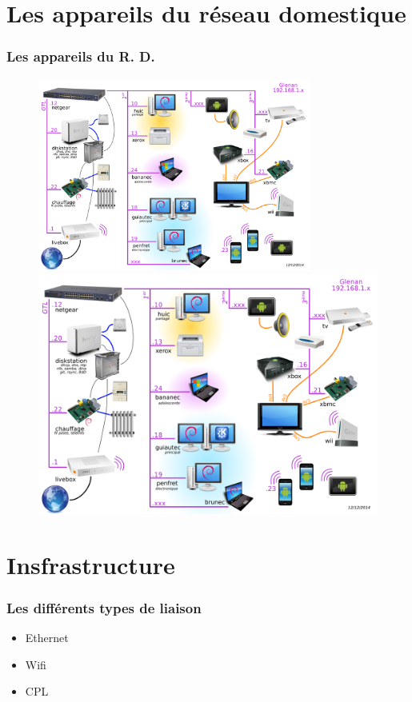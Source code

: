 \documentclass[handout]{beamer}
\begin{document}
\section{Les appareils du réseau domestique}
\begin{frame}\frametitle{Les appareils du R. D.} 
\begin{figure}
		\centering
		\includegraphics[width=0.8\textwidth,natwidth=100,natheight=100]{image/LAN6.png}
		\includegraphics[width=\textwidth,height=0.8\textheight,keepaspectratio]{image/LAN6.png}
\end{figure}
\end{frame}

\section{Insfrastructure}
\begin{frame}\frametitle{Les différents types de liaison} 
\begin{itemize}
\item Ethernet
\item Wifi
\item CPL
\end{itemize}
\end{frame}
\end{document}
